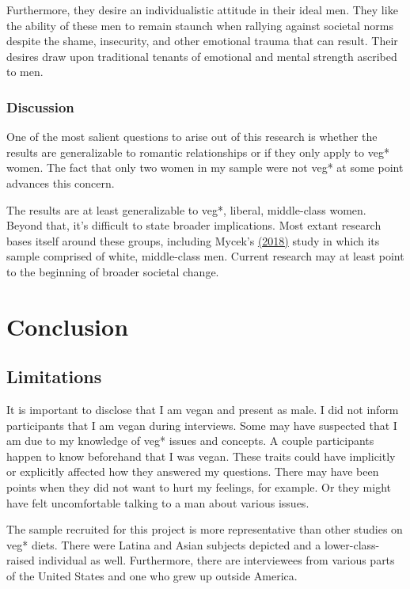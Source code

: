 \documentclass[twoside]{report}
\let\oldsection\section
\renewcommand\section{\clearpage\oldsection}
\begin{document}
Furthermore, they desire an individualistic attitude in their ideal men. They like the ability of these men to remain staunch when rallying against societal norms despite the shame, insecurity, and other emotional trauma that can result. Their desires draw upon traditional tenants of emotional and mental strength ascribed to men.

\subsubsection{Discussion}

One of the most salient questions to arise out of this research is whether the results are generalizable to romantic relationships or if they only apply to veg* women. The fact that only two women in my sample were not veg* at some point advances this concern.

The results are at least generalizable to veg*, liberal, middle-class women. Beyond that, it's difficult to state broader implications. Most extant research bases itself around these groups, including Mycek's \hyperlink{mycek}{(2018)} study in which its sample comprised of white, middle-class men. Current research may at least point to the beginning of broader societal change.

\section{Conclusion}
\subsection{Limitations}

It is important to disclose that I am vegan and present as male. I did not inform participants that I am vegan during interviews. Some may have suspected that I am due to my knowledge of veg* issues and concepts. A couple participants happen to know beforehand that I was vegan. These traits could have implicitly or explicitly affected how they answered my questions. There may have been points when they did not want to hurt my feelings, for example. Or they might have felt uncomfortable talking to a man about various issues.

The sample recruited for this project is more representative than other studies on veg* diets. There were Latina and Asian subjects depicted and a lower-class-raised individual as well. Furthermore, there are interviewees from various parts of the United States and one who grew up outside America.
\end{document}
